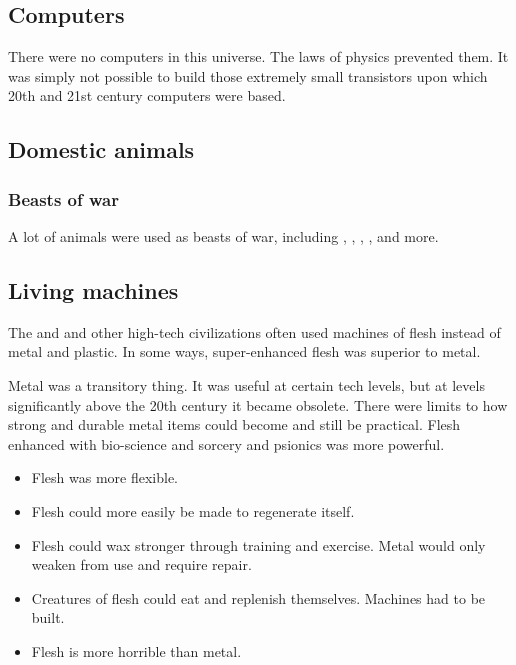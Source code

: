 \subsection{Computers}
There were no computers in this universe.
The laws of physics prevented them.
It was simply not possible to build those extremely small transistors upon which 20th and 21st century computers were based.









\subsection{Domestic animals}





\subsubsection{Beasts of war}
A lot of animals were used as beasts of war, including , , , ,   and more. 









\subsection{Living machines}
The \ophidians and \voyagers and other high-tech civilizations often used machines of flesh instead of metal and plastic. 
In some ways, super-enhanced flesh was superior to metal.

Metal was a transitory thing. 
It was useful at certain tech levels, but at levels significantly above the 20th century it became obsolete. 
There were limits to how strong and durable metal items could become and still be practical. 
Flesh enhanced with bio-science and sorcery and psionics was more powerful. 

\begin{itemize}
  \item Flesh was more flexible.
  \item Flesh could more easily be made to regenerate itself. 
  \item Flesh could wax stronger through training and exercise.
    Metal would only weaken from use and require repair. 
  \item Creatures of flesh could eat and replenish themselves. 
    Machines had to be built.
  \item Flesh is more horrible than metal. 
\end{itemize}

